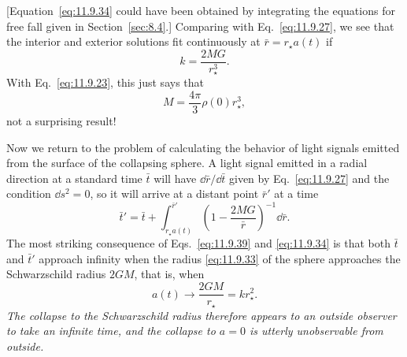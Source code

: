 [Equation~\eqref{eq:11.9.34} could have been obtained by integrating the
equations for free fall given in Section~\ref{sec:8.4}.] Comparing with
Eq.~\eqref{eq:11.9.27}, we see that the interior and exterior solutions fit
continuously at \(\bar r=r_\star a(t)\) if
\begin{equation}
  k=\frac{2MG}{r_\star^3}.
  \tag{11.9.37}\label{eq:11.9.37}
\end{equation}
With Eq.~\eqref{eq:11.9.23}, this just says that
\begin{equation}
  M=\frac{4\pi}{3}\rho(0)r_\star^3,
  \tag{11.9.38}\label{eq:11.9.38}
\end{equation}
not a surprising result!

Now we return to the problem of calculating the behavior of light signals
emitted from the surface of the collapsing sphere. A light signal emitted in
a radial direction at a standard time \(\bar t\) will have
\(\dd\bar r/\dd\bar t\) given by Eq.~\eqref{eq:11.9.27} and the condition
\(\dd s^2=0\), so it will arrive at a distant point \(\bar r'\) at a time
\begin{equation}
  \bar t'
  =
  \bar t+
  \int_{r_\star a(t)}^{\bar r'}
  \left(1-\frac{2MG}{\bar r}\right)^{-1}\dd\bar r.
  \tag{11.9.39}\label{eq:11.9.39}
\end{equation}
The most striking consequence of Eqs.~\eqref{eq:11.9.39} and
\eqref{eq:11.9.34} is that both \(\bar t\) and \(\bar t'\) approach infinity
when the radius \eqref{eq:11.9.33} of the sphere approaches the Schwarzschild
radius \(2GM\), that is, when
\begin{equation}
  a(t)\longrightarrow\frac{2GM}{r_\star}=kr_\star^2.
  \tag{11.9.40}\label{eq:11.9.40}
\end{equation}
\emph{The collapse to the Schwarzschild radius therefore appears to an
outside observer to take an infinite time, and the collapse to \(a=0\) is
utterly unobservable from outside.}

